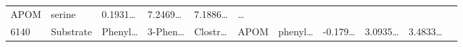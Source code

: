 \documentclass[
]{article}
\begin{document}
\begin{longtable}[]{@{}lllllllllll@{}}
\begin{minipage}[t]{0.07\columnwidth}
APOM\strut
\end{minipage} & \begin{minipage}[t]{0.09\columnwidth}\raggedright
serine\strut
\end{minipage} & \begin{minipage}[t]{0.07\columnwidth}\raggedright
0.1931\ldots{}\strut
\end{minipage} & \begin{minipage}[t]{0.07\columnwidth}\raggedright
7.2469\ldots{}\strut
\end{minipage} & \begin{minipage}[t]{0.07\columnwidth}\raggedright
7.1886\ldots{}\strut
\end{minipage} & \begin{minipage}[t]{0.03\columnwidth}\raggedright
\ldots{}\strut
\end{minipage}\tabularnewline
\begin{minipage}[t]{0.03\columnwidth}\raggedright
6140\strut
\end{minipage} & \begin{minipage}[t]{0.07\columnwidth}\raggedright
Substrate\strut
\end{minipage} & \begin{minipage}[t]{0.07\columnwidth}\raggedright
Phenyl\ldots{}\strut
\end{minipage} & \begin{minipage}[t]{0.09\columnwidth}\raggedright
3-Phen\ldots{}\strut
\end{minipage} & \begin{minipage}[t]{0.07\columnwidth}\raggedright
Clostr\ldots{}\strut
\end{minipage} & \begin{minipage}[t]{0.07\columnwidth}\raggedright
APOM\strut
\end{minipage} & \begin{minipage}[t]{0.09\columnwidth}\raggedright
phenyl\ldots{}\strut
\end{minipage} & \begin{minipage}[t]{0.07\columnwidth}\raggedright
-0.179\ldots{}\strut
\end{minipage} & \begin{minipage}[t]{0.07\columnwidth}\raggedright
3.0935\ldots{}\strut
\end{minipage} & \begin{minipage}[t]{0.07\columnwidth}\raggedright
3.4833\ldots{}\strut
\end{minipage} & \begin{minipage}[t]{0.03\columnwidth}\raggedright

\end{minipage}
\end{longtable}
\end{document}
